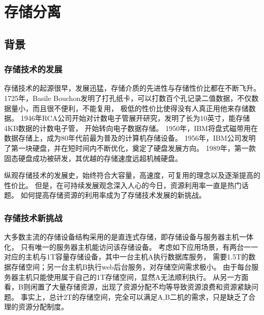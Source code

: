 
\chapter{存储分离} %

\label{Chapter3} %

\section{背景}
\subsection{存储技术的发展}
存储技术的起源很早，发展迅猛，存储介质的先进性与存储性价比都在不断飞升。
1725年，Basile Bouchon发明了打孔纸卡，可以打数百个孔记录二值数据，不仅数据量小，而且很不便利，不能复用，
极低的性价比使得没有人真正用他来存储数据。
1946年RCA公司开始对计数电子管展开研究，发明了长为10英寸，能存储4KB数据的计数电子管，
开始转向电子数据存储。
1950年，IBM将盘式磁带用在数据存储上，成为80年代前最为普及的计算机存储设备。
1956年，IBM公司发明了第一块硬盘，并在短时间内不断优化，奠定了硬盘发展方向。
1989年，第一款固态硬盘成功被研发，其优越的存储速度远超机械硬盘。


纵观存储技术的发展史，始终符合大容量，高速度，可复用的理念以及逐渐提高的性价比。
但是，在可持续发展观念深入人心的今日，资源利用率一直是热门话题。
如何提高存储资源的利用率成为了存储技术发展的新挑战。
\subsection{存储技术新挑战}
大多数主流的存储设备结构采用的是直连式存储，即存储设备与服务器主机一体化，
只有唯一的服务器主机能访问该存储设备。
考虑如下应用场景，有两台一一对应的主机与1T容量存储设备，其中一台主机A执行数据库服务，
需要1.5T的数据存储空间；另一台主机B执行web后台服务，对存储空间需求极小。
由于每台服务器主机只能使用属于自己的1T存储空间，显然A无法顺利执行。
从另一方面看，B则闲置了大量存储资源，出现了资源分配不均等导致资源浪费和资源紧缺问题。
事实上，总计2T的存储空间，完全可以满足A,B二机的需求，只是缺乏了合理的资源分配制度。
